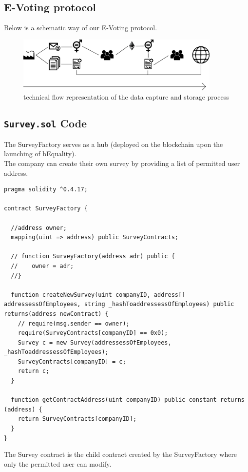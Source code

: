 \documentclass[portrait,a4paper]{article}
\begin{document}
	\subsection{E-Voting protocol}
		Below is a schematic way of our E-Voting protocol.
		\begin{figure}[H]
			\includegraphics[width=0.9\textwidth]{Bilder/Survey_Protocol_preview_2}
			\caption{technical flow representation of the data capture and storage process}
			\label{technical_flow_representation}
		\end{figure}
	
	\subsection{\texttt{Survey.sol} Code}
		The SurveyFactory serves as a hub (deployed on the blockchain upon the launching of bEquality).\\
   		The company can create their own survey by providing a list of permitted user address.
   		\begin{lstlisting}
pragma solidity ^0.4.17;

contract SurveyFactory {

  //address owner;
  mapping(uint => address) public SurveyContracts;

  // function SurveyFactory(address adr) public {
  //    owner = adr;
  //}

  function createNewSurvey(uint companyID, address[] addressessOfEmployees, string _hashToaddressessOfEmployees) public returns(address newContract) {
    // require(msg.sender == owner);
    require(SurveyContracts[companyID] == 0x0);
    Survey c = new Survey(addressessOfEmployees, _hashToaddressessOfEmployees);
    SurveyContracts[companyID] = c;
    return c;
  }
  
  function getContractAddress(uint companyID) public constant returns (address) {
    return SurveyContracts[companyID];
  }
}
   		\end{lstlisting}
   		
   		The Survey contract is the child contract created by the SurveyFactory where only the permitted user can modify.
   		
\end{document}

